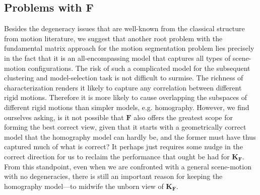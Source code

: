 \documentclass[10pt,twocolumn,letterpaper]{article}
\newcommand{\matr}[1]{\mathbf{#1}}
\begin{document}
\subsection{Problems with $\mathbf{F}$}

Besides the degeneracy issues that are well-known from the classical structure from motion literature, we suggest that another root problem with the fundamental matrix approach for the motion segmentation problem lies precisely in the fact that it is an all-encompassing model that captures all types of scene-motion configurations. The risk of such a complicated model for the subsequent clustering and model-selection task is not difficult to surmise. The richness of characterization renders it likely to capture any correlation between different rigid motions. Therefore it is more likely to cause overlapping the subspaces of different rigid motions than simpler models, e.g. homography. However, we find ourselves asking, is it not possible that $\matr{F}$ also offers the greatest scope for forming the best correct view, given that it starts with a geometrically correct model that the homography model can hardly be, and the former must have thus captured much of what is correct? It perhaps just requires some nudge in the correct direction for us to reclaim the performance that ought be had for $\mathbf{K_F}$. From this standpoint, even when we are confronted with a general scene-motion with no degeneracies, there is still an important reason for keeping the homography model---to midwife the unborn view of $\mathbf{K_F}$.
\end{document}
